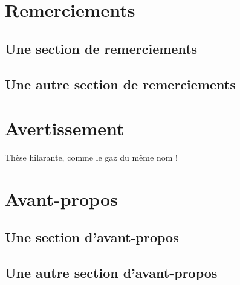 \documentclass[12pt,space=onehalf,version=final]{yathesis}
\begin{document}
\dedication{À mon directeur bien-aimé !}
\dedication{À mon co-directeur bien-co-aimé !}
\makededications
%
\makefrontepigraphs
%
\begin{abstract}
  \lipsum[1-2]
\end{abstract}
\begin{abstract}
  \lipsum[3-4]
\end{abstract}
%
\makeabstract
%
\chapter{Remerciements}
\section{Une section de remerciements}
\lipsum[1]
\section{Une autre section de remerciements}
\lipsum[2-9]
%
\chapter{Avertissement}
Thèse hilarante, comme le gaz du même nom !
%
\printacronyms
%
\printsymbols
%
\chapter{Avant-propos}
\section{Une section d'avant-propos}
\lipsum[30-45]
\section{Une autre section d'avant-propos}
\lipsum[30-35]
%
\tableofcontents[depth=chapter,name=Sommaire]
%
\listoftables
%
\listoffigures
%
%
\mainmatter
%
\end{document}
